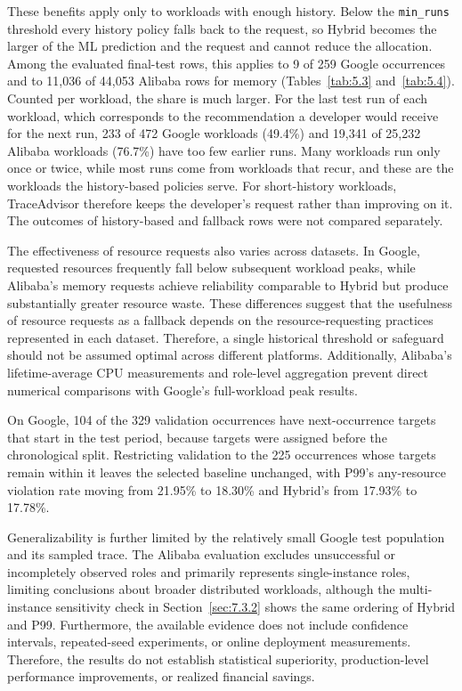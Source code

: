 \documentclass{IEEEtran}
\begin{document}
These benefits apply only to workloads with enough history. Below the \texttt{min\_runs} threshold every history policy falls back to the request, so Hybrid becomes the larger of the ML prediction and the request and cannot reduce the allocation. Among the evaluated final-test rows, this applies to 9 of 259 Google occurrences and to 11,036 of 44,053 Alibaba rows for memory (Tables~\ref{tab:5.3} and~\ref{tab:5.4}). Counted per workload, the share is much larger. For the last test run of each workload, which corresponds to the recommendation a developer would receive for the next run, 233 of 472 Google workloads (49.4\%) and 19,341 of 25,232 Alibaba workloads (76.7\%) have too few earlier runs. Many workloads run only once or twice, while most runs come from workloads that recur, and these are the workloads the history-based policies serve. For short-history workloads, TraceAdvisor therefore keeps the developer's request rather than improving on it. The outcomes of history-based and fallback rows were not compared separately.

The effectiveness of resource requests also varies across datasets. In Google, requested resources frequently fall below subsequent workload peaks, while Alibaba's memory requests achieve reliability comparable to Hybrid but produce substantially greater resource waste. These differences suggest that the usefulness of resource requests as a fallback depends on the resource-requesting practices represented in each dataset. Therefore, a single historical threshold or safeguard should not be assumed optimal across different platforms. Additionally, Alibaba's lifetime-average CPU measurements and role-level aggregation prevent direct numerical comparisons with Google's full-workload peak results.

On Google, 104 of the 329 validation occurrences have next-occurrence targets that start in the test period, because targets were assigned before the chronological split. Restricting validation to the 225 occurrences whose targets remain within it leaves the selected baseline unchanged, with P99's any-resource violation rate moving from 21.95\% to 18.30\% and Hybrid's from 17.93\% to 17.78\%.

Generalizability is further limited by the relatively small Google test population and its sampled trace. The Alibaba evaluation excludes unsuccessful or incompletely observed roles and primarily represents single-instance roles, limiting conclusions about broader distributed workloads, although the multi-instance sensitivity check in Section~\ref{sec:7.3.2} shows the same ordering of Hybrid and P99. Furthermore, the available evidence does not include confidence intervals, repeated-seed experiments, or online deployment measurements. Therefore, the results do not establish statistical superiority, production-level performance improvements, or realized financial savings.
\end{document}
